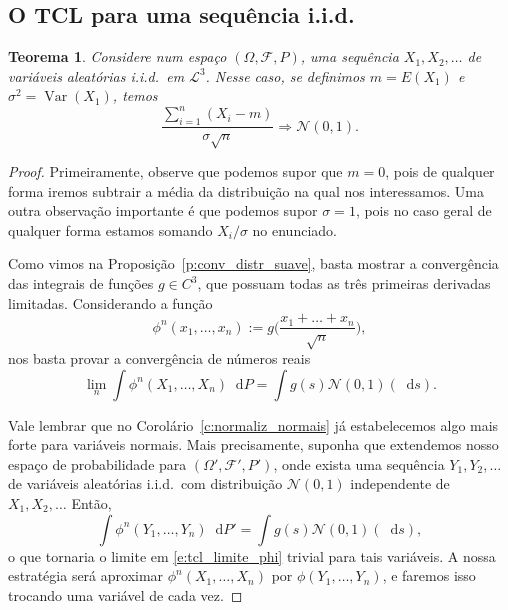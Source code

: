 \documentclass[reqno, final]{book}
\newcommand*\1{\mathds{1}}
\newtheorem{theorem}{Teorema}[section]
\DeclareMathOperator{\Var}{Var}
\def \iid{i.i.d.~}
\renewcommand*\d{\mathop{}\!\mathrm{d}}
\begin{document}
\subsection{O TCL para uma sequência i.i.d.}

\begin{theorem}
  \label{:tcl_iid}
  Considere num espaço $(\Omega, \mathcal{F}, P)$, uma sequência $X_1, X_2, \dots$ de variáveis aleatórias \iid em $\mathcal{L}^3$.
  Nesse caso, se definimos $m = E(X_1)$ e $\sigma^2 = \Var(X_1)$, temos
  \begin{equation}
    \frac{\sum_{i=1}^n (X_i - m)}{\sigma \sqrt{n}} \Rightarrow \mathcal{N}(0,1).
  \end{equation}
\end{theorem}

\begin{proof}
  Primeiramente, observe que podemos supor que $m = 0$, pois de qualquer forma iremos subtrair a média da distribuição na qual nos interessamos.
  Uma outra observação importante é que podemos supor $\sigma = 1$, pois no caso geral de qualquer forma estamos somando $X_i/\sigma$ no enunciado.

  Como vimos na Proposição~\ref{p:conv_distr_suave}, basta mostrar a convergência das integrais de funções $g \in C^3$, que possuam todas as três primeiras derivadas limitadas.
  Considerando a função
  \begin{equation}
    \phi^n(x_1, \dots, x_n) := g\Big(\frac{x_1 + \dots + x_n}{\sqrt{n}} \Big),
  \end{equation}
  nos basta provar a convergência de números reais
  \begin{equation}
    \label{e:tcl_limite_phi}
    \lim_n \int \phi^n(X_1, \dots, X_n) \d P = \int g(s) \mathcal{N}(0,1)(\d s).
  \end{equation}

  Vale lembrar que no Corolário~\ref{c:normaliz_normais} já estabelecemos algo mais forte para variáveis normais.
  Mais precisamente, suponha que extendemos nosso espaço de probabilidade para $(\Omega', \mathcal{F}', P')$, onde exista uma sequência $Y_1, Y_2, \dots$ de variáveis aleatórias \iid com distribuição $\mathcal{N}(0,1)$ independente de $X_1, X_2, \dots$
  Então,
  \begin{equation}
    \int \phi^n(Y_1, \dots, Y_n) \d P' = \int g(s) \mathcal{N}(0,1) (\d s),
  \end{equation}
  o que tornaria o limite em \eqref{e:tcl_limite_phi} trivial para tais variáveis.
  A nossa estratégia será aproximar $\phi^n(X_1, \dots, X_n)$ por $\phi(Y_1, \dots, Y_n)$, e faremos isso trocando uma variável de cada vez.


\end{proof}
\end{document}
